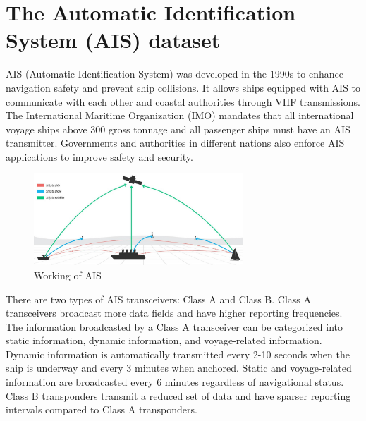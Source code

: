 \section{The Automatic Identification System (AIS) dataset}

AIS (Automatic Identification System) was developed in the 1990s to enhance navigation safety and prevent ship collisions.
It allows ships equipped with AIS to communicate with each other and coastal authorities through VHF transmissions.
The International Maritime Organization (IMO) mandates that all international voyage ships above 300 gross tonnage and all passenger ships must have an AIS transmitter.
Governments and authorities in different nations also enforce AIS applications to improve safety and security.

\begin{figure}[h]
    \centering
    \includegraphics[width=0.7\textwidth]{images/ais.jpeg}
    \caption{Working of AIS}
    \label{ais}
\end{figure}

There are two types of AIS transceivers: Class A and Class B.
Class A transceivers broadcast more data fields and have higher reporting frequencies.
The information broadcasted by a Class A transceiver can be categorized into static information, dynamic information, and voyage-related information.
Dynamic information is automatically transmitted every 2-10 seconds when the ship is underway and every 3 minutes when anchored.
Static and voyage-related information are broadcasted every 6 minutes regardless of navigational status.
Class B transponders transmit a reduced set of data and have sparser reporting intervals compared to Class A transponders.


